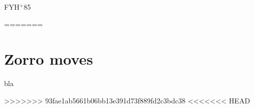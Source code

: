 \documentclass{compositio}
\theoremstyle{definition}
\numberwithin{equation}{section}
\begin{document}
\newcommand{\etalchar}[1]{$^{#1}$}
\providecommand{\href}[2]{#2}
\begin{thebibliography}{FYH{\etalchar{+}}85}

=======
\section{Zorro moves}

bla



%
>>>>>>> 93fae1ab5661b06bb13e391d73f889fd2c3bdc38
%
%
%
%
%
%
%
<<<<<<< HEAD


\end{thebibliography}
\end{document}
